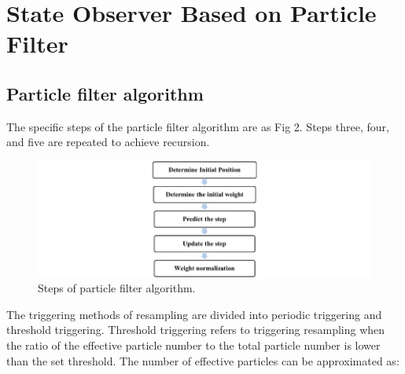 \section{State Observer Based on Particle Filter}

\subsection{Particle filter algorithm}

The specific steps of the particle filter algorithm are as Fig 2. Steps three, four, and five are repeated to achieve recursion.

\begin{figure}
    \centering
    
    \includegraphics{Sensor_Fusion_pictures/figure2.png}
    \caption{Steps of particle filter algorithm.}
    \label{stepsOfAlgorithm}
\end{figure}

The triggering methods of resampling are divided into periodic triggering and threshold triggering. Threshold triggering refers to triggering resampling when the ratio of the effective particle number to the total particle number is lower than the set threshold. The number of effective particles can be approximated as:

\begin{equation}
    
\end{equation}